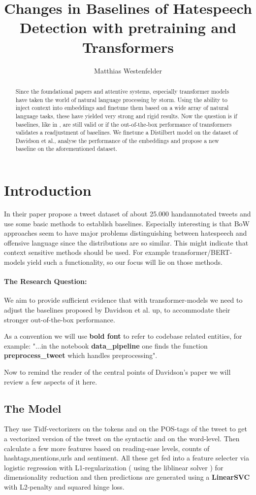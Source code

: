 \documentclass[11pt,a4paper]{article}
\title{Changes in Baselines of Hatespeech Detection with pretraining and Transformers}
\author{Matthias Westenfelder}
\begin{document}
\maketitle
\begin{abstract}
  Since the foundational papers \cite{Attention_is_all_you_need} and \cite{BERT} attentive systems, especially transformer models have 
  taken the world of natural language processing by storm. Using the ability to inject context into embeddings and
  finetune them based on a wide array of natural language tasks, these have yielded very strong and rigid results.
  Now the question is if baselines, like in \cite{auto_hatespeech}, are still valid or if the out-of-the-box performance of transformers
  validates a readjustment of baselines.
  We finetune a Distilbert model on the dataset of Davidson et al., analyse the performance of the embeddings
  and propose a new baseline on the aforementioned dataset.
\end{abstract}
 

\section{Introduction}
In their paper \cite{auto_hatespeech} propose a tweet dataset of about 25.000 handannotated tweets and use some basic methods to establish baselines.
Especially interesting is that BoW approaches seem to have major problems distinguishing between hatespeech and offensive language since the distributions are so similar.
This might indicate that context sensitive methods should be used. 
For example transformer/BERT-models yield such a functionality, so our focus will lie on those methods.

\paragraph{The Research Question:} We aim to provide sufficient evidence that with transformer-models we need to adjust the baselines proposed by Davidson et al. up,
to accommodate their stronger out-of-the-box performance.

As a convention we will use \textbf{bold font} to refer to codebase related entities, for example: 
"...in the notebook \textbf{data\_pipeline} one finds the function \textbf{preprocess\_tweet} which handles preprocessing".

Now to remind the reader of the central points of Davidson's paper we will review a few aspects of it here.

\subsection{The Model}
They use Tidf-vectorizers on the tokens and on the POS-tags of the tweet to get a vectorized 
version of the tweet on the syntactic and on the word-level.
Then calculate a few more features based on reading-ease levels, counts of hashtags,mentions,urls and sentiment.
All these get fed into a feature selecter via logistic regression with L1-regularization ( using the liblinear solver )
for dimensionality reduction and then predictions are generated using a \textbf{LinearSVC} with L2-penalty and squared hinge loss.
\end{document}
